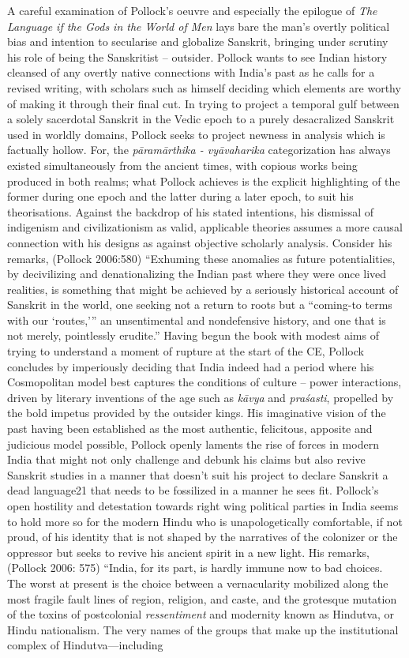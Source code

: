 A careful examination of Pollock’s oeuvre and especially the epilogue of \textit{The Language if the Gods in the World of Men} lays bare the man’s overtly political bias and intention to secularise and globalize Sanskrit, bringing under scrutiny his role of being the Sanskritist – outsider. Pollock wants to see Indian history cleansed of any overtly native connections with India’s past as he calls for a revised writing, with scholars such as himself deciding which elements are worthy of making it through their final cut. In trying to project a temporal gulf between a solely sacerdotal Sanskrit in the Vedic epoch to a purely desacralized Sanskrit used in worldly domains, Pollock seeks to project newness in analysis which is factually hollow. For, the \textit{pāramārthika - vyāvaharika} categorization has always existed simultaneously from the ancient times, with copious works being produced in both realms; what Pollock achieves is the explicit highlighting of the former during one epoch and the latter during a later epoch, to suit his theorisations. Against the backdrop of his stated intentions, his dismissal of indigenism and civilizationism as valid, applicable theories assumes a more causal connection with his designs as against objective scholarly analysis. Consider his remarks, (Pollock 2006:580) “Exhuming these anomalies as future potentialities, by decivilizing and denationalizing the Indian past where they were once lived realities, is something that might be achieved by a seriously historical account of Sanskrit in the world, one seeking not a return to roots but a “coming-to terms with our ‘routes,’” an unsentimental and nondefensive history, and one that is not merely, pointlessly erudite.” Having begun the book with modest aims of trying to understand a moment of rupture at the start of the CE, Pollock concludes by imperiously deciding that India indeed had a period where his Cosmopolitan model best captures the conditions of culture – power interactions, driven by literary inventions of the age such as \textit{kāvya} and \textit{praśasti}, propelled by the bold impetus provided by the outsider kings. His imaginative vision of the past having been established as the most authentic, felicitous, apposite and judicious model possible, Pollock openly laments the rise of forces in modern India that might not only challenge and debunk his claims but also revive Sanskrit studies in a manner that doesn’t suit his project to declare Sanskrit a dead language21 that needs to be fossilized in a manner he sees fit. Pollock’s open hostility and detestation towards right wing political parties in India seems to hold more so for the modern Hindu who is unapologetically comfortable, if not proud, of his identity that is not shaped by the narratives of the colonizer or the oppressor but seeks to revive his ancient spirit in a new light. His remarks, (Pollock 2006: 575) “India, for its part, is hardly immune now to bad choices. The worst at present is the choice between a vernacularity mobilized along the most fragile fault lines of region, religion, and caste, and the grotesque mutation of the toxins of postcolonial \textit{ressentiment} and modernity known as Hindutva, or Hindu nationalism. The very names of the groups that make up the institutional complex of Hindutva—including 